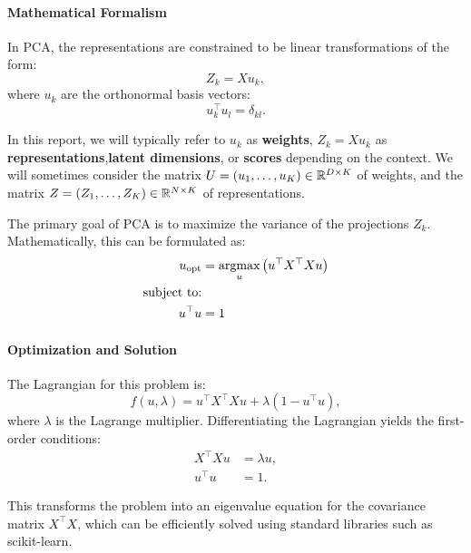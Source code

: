 \paragraph{Mathematical Formalism} In PCA, the representations are constrained to be linear transformations of the form:
\begin{equation}\label{eq:pca-linear-function-def}
    Z_k = X u_k,
\end{equation}
where $u_k$ are the orthonormal basis vectors:
\begin{equation}\label{eq:pca-orthonormality-constraint}
    u_k^\top u_l = \delta_{kl}.
\end{equation}

In this report, we will typically refer to $u_k$ as \textbf{weights}, $Z_k = X u_k$ as \textbf{representations},\textbf{latent
dimensions}, or \textbf{scores} depending on the context. We will sometimes consider the matrix $U = \left(u_1, \dots, u_K\right) \in \mathbb{R}^{D \times K}$ of weights, and the matrix $Z = \left(Z_1, \dots, Z_K\right) \in \mathbb{R}^{N \times K}$ of representations.

The primary goal of PCA is to maximize the variance of the projections \(Z_k\). Mathematically, this can be formulated
as:
\begin{align}
    u_{\text{opt}} &= \underset{u}{\text{argmax}} \left( u^\top X^\top Xu \right) \\
    \text{subject to:} \notag \\
    u^\top u &= 1 \notag
\end{align}

\paragraph{Optimization and Solution}
The Lagrangian for this problem is:
\begin{equation}
    f(u,\lambda) = u^\top X^\top Xu + \lambda(1 - u^\top u),
\end{equation}
where \(\lambda\) is the Lagrange multiplier. Differentiating the Lagrangian yields the first-order conditions:
\begin{align}
    X^\top X u &= \lambda u, \\
    u^\top u &= 1.
\end{align}

This transforms the problem into an eigenvalue equation for the covariance matrix \(X^\top X\), which can be efficiently solved using standard libraries such as scikit-learn\cite{pedregosa2011scikit}.

